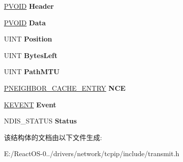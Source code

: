 \begin{DoxyCompactItemize}
\item 
\mbox{\label{struct_i_p_f_r_a_g_m_e_n_t___c_o_n_t_e_x_t_a9e42bc7b67f165f2daaa7ff9c22b5677}} 
\hyperlink{interfacevoid}{P\+V\+O\+ID} {\bfseries Header}
\item 
\mbox{\label{struct_i_p_f_r_a_g_m_e_n_t___c_o_n_t_e_x_t_a6e176bf3163f2f3d6cd76a1eba4eee31}} 
\hyperlink{interfacevoid}{P\+V\+O\+ID} {\bfseries Data}
\item 
\mbox{\label{struct_i_p_f_r_a_g_m_e_n_t___c_o_n_t_e_x_t_a9c7cd50a44b25c1c4116905c70f51a87}} 
U\+I\+NT {\bfseries Position}
\item 
\mbox{\label{struct_i_p_f_r_a_g_m_e_n_t___c_o_n_t_e_x_t_a7639e47d5963c84d9e60aa23fb79cede}} 
U\+I\+NT {\bfseries Bytes\+Left}
\item 
\mbox{\label{struct_i_p_f_r_a_g_m_e_n_t___c_o_n_t_e_x_t_a6ec5cf4974cf408177f45c421341bf57}} 
U\+I\+NT {\bfseries Path\+M\+TU}
\item 
\mbox{\label{struct_i_p_f_r_a_g_m_e_n_t___c_o_n_t_e_x_t_a8cb61d7d3bca9edc88421f0f574176aa}} 
\hyperlink{struct_n_e_i_g_h_b_o_r___c_a_c_h_e___e_n_t_r_y}{P\+N\+E\+I\+G\+H\+B\+O\+R\+\_\+\+C\+A\+C\+H\+E\+\_\+\+E\+N\+T\+RY} {\bfseries N\+CE}
\item 
\mbox{\label{struct_i_p_f_r_a_g_m_e_n_t___c_o_n_t_e_x_t_a47bd9ea57c6810149baa0247b19d1be4}} 
\hyperlink{struct___k_e_v_e_n_t}{K\+E\+V\+E\+NT} {\bfseries Event}
\item 
\mbox{\label{struct_i_p_f_r_a_g_m_e_n_t___c_o_n_t_e_x_t_a9020025d0ef9e3aa517dd5423d37fede}} 
N\+D\+I\+S\+\_\+\+S\+T\+A\+T\+US {\bfseries Status}
\end{DoxyCompactItemize}


该结构体的文档由以下文件生成\+:\begin{DoxyCompactItemize}
\item 
E\+:/\+React\+O\+S-\/0../drivers/network/tcpip/include/transmit.\+h\end{DoxyCompactItemize}
